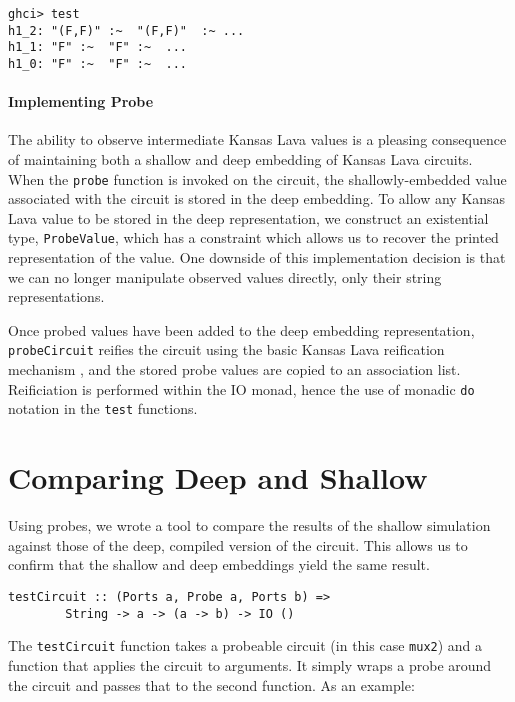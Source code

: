 \documentclass{llncs}
\begin{document}
\begin{verbatim}
ghci> test
h1_2: "(F,F)" :~  "(F,F)"  :~ ...
h1_1: "F" :~  "F" :~  ...
h1_0: "F" :~  "F" :~  ...
\end{verbatim}

\paragraph{Implementing Probe}

The ability to observe intermediate Kansas Lava values is a pleasing consequence
of maintaining both a shallow and deep embedding of Kansas Lava
circuits. When the \verb!probe! function is invoked on the circuit, the
shallowly-embedded value associated with the circuit is stored in the deep
embedding. To allow any Kansas Lava value to be stored in the deep
representation, we construct an existential type, \verb!ProbeValue!, which has a
constraint which allows us to recover the printed representation of the
value. One downside of this implementation decision is that we can no longer
manipulate observed values directly, only their string representations.

Once probed values have been added to the deep embedding representation, 
\verb!probeCircuit! reifies the circuit using the basic Kansas Lava reification
mechanism \cite{}, and the stored probe values are copied to an association
list. Reificiation is performed within the IO monad, hence the use of monadic \verb!do!
notation in the \verb!test! functions.


\section{Comparing Deep and Shallow}
\label{sec:comparing}

Using probes, we wrote a tool to compare the results of the shallow simulation
against those of the deep, compiled version of the circuit. This allows us to
confirm that the shallow and deep embeddings yield the same result.

\begin{verbatim}
testCircuit :: (Ports a, Probe a, Ports b) =>
		String -> a -> (a -> b) -> IO ()
\end{verbatim}

The \verb!testCircuit! function takes a probeable circuit (in this case \verb!mux2!) and
a function that applies the circuit to arguments. It simply wraps a probe around
the circuit and passes that to the second function. As an example:
\end{document}
